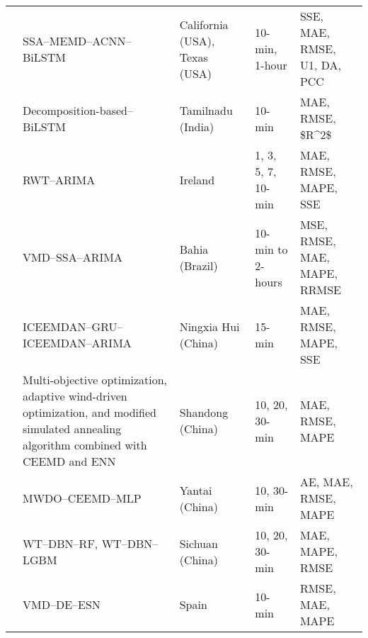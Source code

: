 \begin{scriptsize}
\begin{center}
\begin{longtable}{p{1.5cm}p{5cm}p{3cm}p{2cm}p{2cm}}
 & \ac{SSA}--\ac{MEMD}--\ac{ACNN}--\ac{BiLSTM} \cite{zhang2021Hybrid} & California (\ac{USA}), Texas (\ac{USA}) & 10-min, 1-hour & \ac{SSE}, \ac{MAE}, \ac{RMSE}, \ac{U1}, \ac{DA}, \ac{PCC} \\
 & Decomposition-based--\ac{BiLSTM} \cite{jaseena2021Decompositionbased} & Tamilnadu (India) & 10-min & \ac{MAE}, \ac{RMSE}, \ac{$R^2$} \\
 & \ac{RWT}--\ac{ARIMA} \cite{singh2019Repeated} & Ireland & 1, 3, 5, 7, 10-min & \ac{MAE}, \ac{RMSE}, \ac{MAPE}, \ac{SSE} \\
 & \ac{VMD}--\ac{SSA}--\ac{ARIMA} \cite{moreno2021Hybrid} & Bahia (Brazil) & 10-min to 2-hours & \ac{MSE}, \ac{RMSE}, \ac{MAE}, \ac{MAPE}, \ac{RRMSE} \\
 & \ac{ICEEMDAN}--\ac{GRU}--\ac{ICEEMDAN}--\ac{ARIMA} \cite{duan2021Shortterm} & Ningxia Hui (China) & 15-min & \ac{MAE}, \ac{RMSE}, \ac{MAPE}, \ac{SSE} \\
 & Multi-objective optimization, adaptive wind-driven optimization, and modified simulated annealing algorithm combined with \ac{CEEMD} and \ac{ENN} \cite{wang2021Ultrashortterm} & Shandong (China) & 10, 20, 30-min & \ac{MAE}, \ac{RMSE}, \ac{MAPE} \\
 & \ac{MWDO}--\ac{CEEMD}--\ac{MLP} \cite{yang2018Hybrid} & Yantai (China) & 10, 30-min & \ac{AE}, \ac{MAE}, \ac{RMSE}, \ac{MAPE} \\
 & \ac{WT}--\ac{DBN}--\ac{RF}, \ac{WT}--\ac{DBN}--\ac{LGBM} \cite{jiajun2020Ultrashort} & Sichuan (China) & 10, 20, 30-min & \ac{MAE}, \ac{MAPE}, \ac{RMSE} \\
 & \ac{VMD}--\ac{DE}--\ac{ESN} \cite{hu2021Wind} & Spain & 10-min & \ac{RMSE}, \ac{MAE}, \ac{MAPE} \\ \hline
\end{longtable}%
\end{center}
\end{scriptsize}

